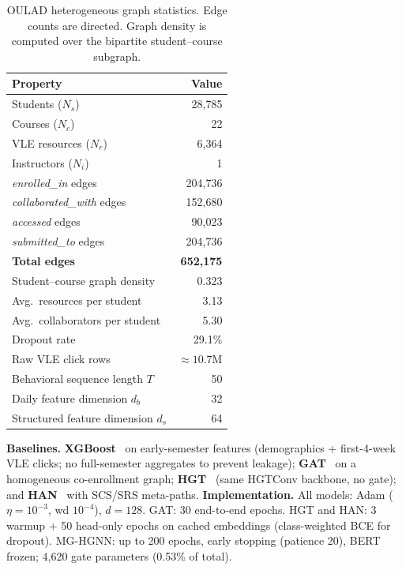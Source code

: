 \documentclass[sigconf]{acmart}
\begin{document}
\begin{table}[t]
\centering
\caption{OULAD heterogeneous graph statistics.
Edge counts are directed. Graph density is computed
over the bipartite student--course subgraph.}
\label{tab:graph_stats}
\begin{tabular}{lr}
\toprule
\textbf{Property} & \textbf{Value} \\
\midrule
Students ($N_s$) & 28,785 \\
Courses ($N_c$) & 22 \\
VLE resources ($N_r$) & 6,364 \\
Instructors ($N_i$) & 1 \\
\midrule
\textit{enrolled\_in} edges & 204,736 \\
\textit{collaborated\_with} edges & 152,680 \\
\textit{accessed} edges & 90,023 \\
\textit{submitted\_to} edges & 204,736 \\
\textbf{Total edges} & \textbf{652,175} \\
\midrule
Student--course graph density & 0.323 \\
Avg.\ resources per student & 3.13 \\
Avg.\ collaborators per student & 5.30 \\
\midrule
Dropout rate & 29.1\% \\
Raw VLE click rows & ${\approx}10.7$M \\
Behavioral sequence length $T$ & 50 \\
Daily feature dimension $d_b$ & 32 \\
Structured feature dimension $d_s$ & 64 \\
\bottomrule
\end{tabular}
\end{table}

\textbf{Baselines.}
\textbf{XGBoost}~\citep{chen2016xgboost} on early-semester
features (demographics + first-4-week VLE clicks; no
full-semester aggregates to prevent leakage);
\textbf{GAT}~\citep{velivckovic2018graph} on a homogeneous
co-enrollment graph;
\textbf{HGT}~\citep{hu2020heterogeneous} (same HGTConv
backbone, no gate); and
\textbf{HAN}~\citep{wang2019heterogeneous} with SCS/SRS
meta-paths.
\textbf{Implementation.} All models: Adam ($\eta{=}10^{-3}$,
wd $10^{-4}$), $d{=}128$. GAT: 30 end-to-end epochs.
HGT and HAN: 3 warmup $+$ 50 head-only epochs on cached
embeddings (class-weighted BCE for dropout). MG-HGNN: up
to 200 epochs, early stopping (patience 20), BERT frozen;
4{,}620 gate parameters (0.53\% of total).
\end{document}
